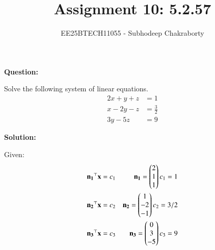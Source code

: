 \documentclass[journal,12pt,onecolumn]{IEEEtran}
\theoremstyle{remark}
\begin{document}

\vspace{3cm}

\title{Assignment 10: 5.2.57}
\author{EE25BTECH11055 - Subhodeep Chakraborty}
\maketitle
\hrulefill
\bigskip

\renewcommand{\thefigure}{\theenumi}
\renewcommand{\thetable}{\theenumi}

\textbf{Question:}\par
Solve the following system of linear equations.
\begin{align*}
 2x+y+z&=1\\
 x-2y-z&=\frac{3}{2}\\
 3y-5z&=9
\end{align*}
\par
\textbf{Solution:}\par

Given:
\begin{align}
 \mathbf{n_1}^\top\mathbf{x}&=c_1 &\mathbf{n_1} = \begin{pmatrix}2\\1\\1\end{pmatrix} c_1 = 1\\
 \mathbf{n_2}^\top\mathbf{x}&=c_2 &\mathbf{n_2} = \begin{pmatrix}1\\-2\\-1\end{pmatrix} c_2 = 3/2\\
 \mathbf{n_3}^\top\mathbf{x}&=c_3 &\mathbf{n_3} = \begin{pmatrix}0 \\3 \\ -5\end{pmatrix} c_3 = 9
\end{align}
\end{document}
